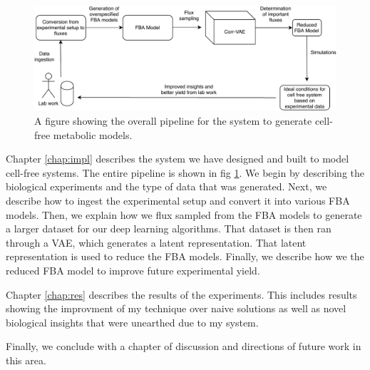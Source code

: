 \begin{figure}[t!]
\begin{center}
\includegraphics[width=\textwidth]{figs/SystemOverview.pdf}
\end{center}
\label{fig:overview}
\caption{A figure showing the overall pipeline for the system to generate cell-free metabolic models.}
\end{figure}

Chapter \ref{chap:impl} describes the system we have designed and built to model cell-free systems.
The entire pipeline is shown in fig \ref{fig:overview}.
We begin by describing the biological experiments and the type of data that was generated.
Next, we describe how to ingest the experimental setup and convert it into various FBA models.
Then, we explain how we flux sampled from the FBA models to generate a larger dataset for our deep learning algorithms.
That dataset is then ran through a VAE, which generates a latent representation.
That latent representation is used to reduce the FBA models.
Finally, we describe how we the reduced FBA model to improve future experimental yield.

Chapter \ref{chap:res} describes the results of the experiments.
This includes results showing the improvment of my technique over naive solutions as well as novel biological insights that were unearthed due to my system.

Finally, we conclude with a chapter of discussion and directions of future work in this area.
